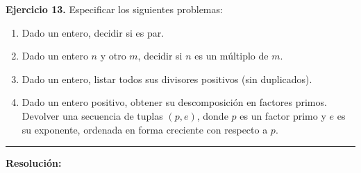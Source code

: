 \hypertarget{ej13}{}
\noindent \textbf{Ejercicio 13.} Especificar los siguientes problemas:

\begin{enumerate}[label=\alph*)]
    \item Dado un entero, decidir si es par.
    \item Dado un entero $n$ y otro $m$, decidir si $n$ es un múltiplo de $m$.
    \item Dado un entero, listar todos sus divisores positivos (sin duplicados).
    \item Dado un entero positivo, obtener su descomposición en factores primos. Devolver una secuencia de tuplas $(p, e)$, donde $p$ es un factor primo y $e$ es su exponente, ordenada en forma creciente con respecto a $p$.
\end{enumerate}

\vspace{0.2cm}
{\color{gray}\hrule}
\vspace{0.4cm}

\textbf{Resolución:}

